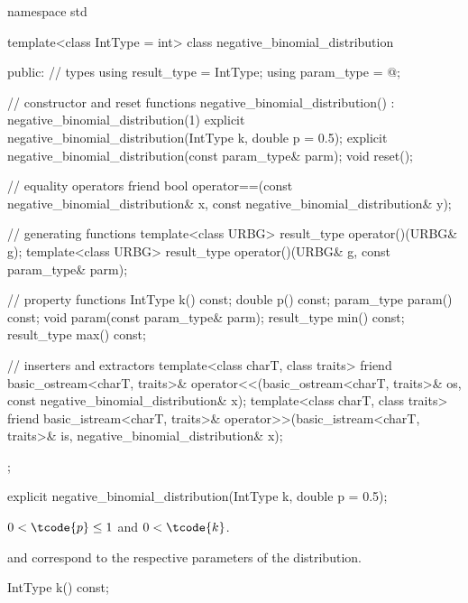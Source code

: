 %
%
\begin{codeblock}
namespace std {
  template<class IntType = int>
  class negative_binomial_distribution {
  public:
    // types
    using result_type = IntType;
    using param_type  = @\unspec@;

    // constructor and reset functions
    negative_binomial_distribution() : negative_binomial_distribution(1) {}
    explicit negative_binomial_distribution(IntType k, double p = 0.5);
    explicit negative_binomial_distribution(const param_type& parm);
    void reset();

    // equality operators
    friend bool operator==(const negative_binomial_distribution& x,
                           const negative_binomial_distribution& y);

    // generating functions
    template<class URBG>
      result_type operator()(URBG& g);
    template<class URBG>
      result_type operator()(URBG& g, const param_type& parm);

    // property functions
    IntType k() const;
    double p() const;
    param_type param() const;
    void param(const param_type& parm);
    result_type min() const;
    result_type max() const;

    // inserters and extractors
    template<class charT, class traits>
      friend basic_ostream<charT, traits>&
        operator<<(basic_ostream<charT, traits>& os, const negative_binomial_distribution& x);
    template<class charT, class traits>
      friend basic_istream<charT, traits>&
        operator>>(basic_istream<charT, traits>& is, negative_binomial_distribution& x);
  };
}
\end{codeblock}


%
\begin{itemdecl}
explicit negative_binomial_distribution(IntType k, double p = 0.5);
\end{itemdecl}

\begin{itemdescr}
\pnum
\expects
$0 < \tcode{p} \leq 1$
and $0 < \tcode{k} $.

\pnum
\remarks
  and 
 correspond to the respective parameters of the distribution.
\end{itemdescr}

%
\begin{itemdecl}
IntType k() const;
\end{itemdecl}

